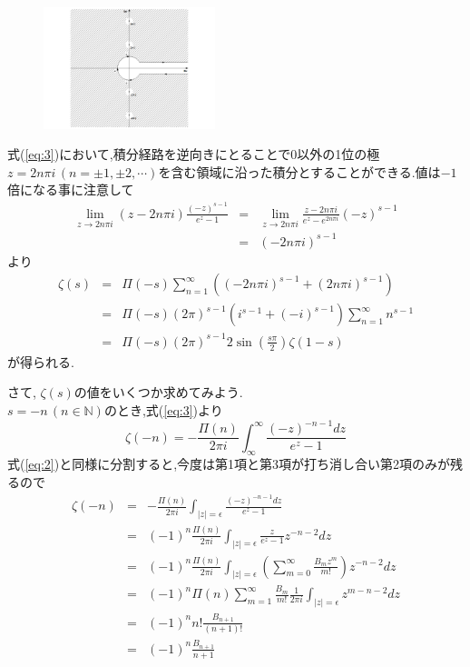 \begin{figure}
\vspace{-2\baselineskip}
\begin{center}
\includegraphics[width=50mm]{zetamura3.pdf}
\end{center}
\end{figure}
式(\ref{eq:3})において,積分経路を逆向きにとることで0以外の1位の極$z=2n\pi i\,(n=\pm1,\pm2,\cdots)$を含む領域に沿った積分とすることができる.値は$-1$倍になる事に注意して
\begin{eqnarray*}
\lim_{z\to 2n\pi i}(z-2n\pi i)\frac{(-z)^{s-1}}{e^z-1} &=& \lim_{z\to 2n\pi i}\frac{z-2n\pi i}{e^z-e^{2n\pi i}}(-z)^{s-1}\\
&=& (-2n\pi i)^{s-1}
\end{eqnarray*}
より
\begin{eqnarray}
\zeta(s) &=& \Pi(-s)\sum_{n=1}^\infty ((-2n\pi i)^{s-1}+(2n\pi i)^{s-1})\nonumber\\
&=& \Pi(-s)(2\pi)^{s-1}\left(i^{s-1}+(-i)^{s-1}\right)\sum_{n=1}^\infty n^{s-1}\nonumber\\
&=& \Pi(-s)(2\pi)^{s-1}2\sin\left(\frac{s\pi}{2}\right)\zeta(1-s)\label{eq:4}
\end{eqnarray}
が得られる.

さて, $\zeta(s)$の値をいくつか求めてみよう.\\
$s=-n\,(n\in\mathbb{N})$のとき,式(\ref{eq:3})より
\[
\zeta(-n) = -\frac{\Pi(n)}{2\pi i}\int_\infty^\infty \frac{(-z)^{-n-1}dz}{e^z-1}
\]
式(\ref{eq:2})と同様に分割すると,今度は第1項と第3項が打ち消し合い第2項のみが残るので
\begin{eqnarray*}
\zeta(-n) &=& -\frac{\Pi(n)}{2\pi i}\int_{|z|=\epsilon} \frac{(-z)^{-n-1}dz}{e^z-1}\\
&=& (-1)^n\frac{\Pi(n)}{2\pi i}\int_{|z|=\epsilon}\frac{z}{e^z-1}z^{-n-2}dz\\
&=& (-1)^n\frac{\Pi(n)}{2\pi i}\int_{|z|=\epsilon} \left(\sum_{m=0}^\infty \frac{B_m z^m}{m!}\right)z^{-n-2}dz\\
&=& (-1)^n \Pi(n)\sum_{m=1}^\infty \frac{B_m}{m!} \frac{1}{2\pi i}\int_{|z|=\epsilon} z^{m-n-2}dz\\
&=& (-1)^n n!\frac{B_{n+1}}{(n+1)!}\\
&=& (-1)^n \frac{B_{n+1}}{n+1}
\end{eqnarray*}

